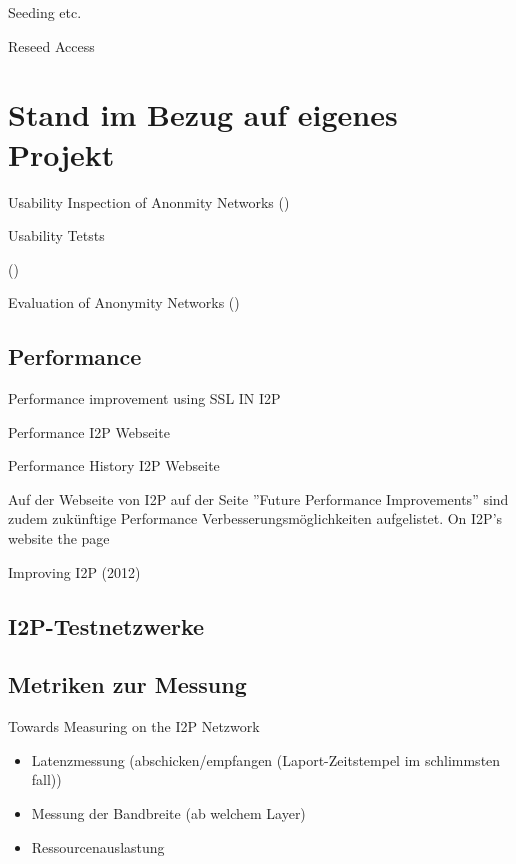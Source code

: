 Seeding etc.

Reseed Access
\cite{noauthor_i2p_nodate-7}

\section{Stand im Bezug auf eigenes Projekt}

Usability Inspection of Anonmity Networks
(\cite{abou-tair_usability_2009})

Usability Tetsts

(\cite{schomburg_anonymity_2009})

Evaluation of Anonymity Networks
(\cite{timpanaro_evaluation_2015})

\subsection{Performance}


Performance improvement using SSL IN I2P
\cite{vashi_performance_2015}

Performance I2P Webseite
\cite{noauthor_performance_nodate}

Performance History I2P Webseite
\cite{noauthor_performance_nodate-1}

Auf der Webseite von I2P auf der Seite ''Future Performance Improvements'' sind zudem zukünftige Performance Verbesserungsmöglichkeiten aufgelistet.
\cite{noauthor_future_nodate}
On I2P's website the page 

Improving I2P (2012)
\cite{timpanaro_improving_2012}


\subsection{I2P-Testnetzwerke}

\subsection{Metriken zur Messung}

Towards Measuring on the I2P Netzwork
\cite{wang_towards_2013}

\begin{itemize}
    \item Latenzmessung (abschicken/empfangen (Laport-Zeitstempel im schlimmsten fall))
    \item Messung der Bandbreite (ab welchem Layer)
    \item Ressourcenauslastung
\end{itemize}

